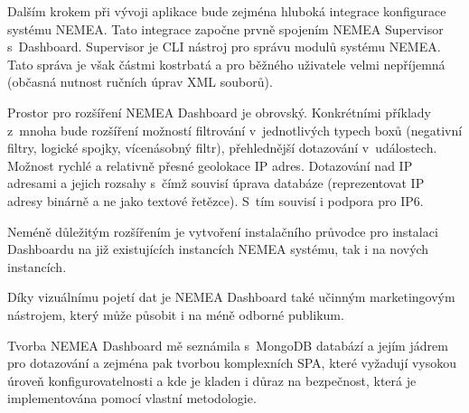 Dalším krokem při vývoji aplikace bude zejména hluboká integrace konfigurace systému NEMEA. Tato integrace započne prvně spojením NEMEA Supervisor s~Dashboard. Supervisor je CLI nástroj pro správu modulů systému NEMEA. Tato správa je však částmi kostrbatá a pro běžného uživatele velmi nepříjemná (občasná nutnost ručních úprav XML souborů).

Prostor pro rozšíření NEMEA Dashboard je obrovský. Konkrétními příklady z~mnoha bude rozšíření možností filtrování v~jednotlivých typech boxů (negativní filtry, logické spojky, vícenásobný filtr), přehlednější dotazování v~událostech. Možnost rychlé a relativně přesné geolokace IP adres. Dotazování nad IP adresami a jejich rozsahy s~čímž souvisí úprava databáze (reprezentovat IP adresy binárně a ne jako textové řetězce). S~tím souvisí i podpora pro IP6.

Neméně důležitým rozšířením je vytvoření instalačního průvodce pro instalaci Dashboardu na již existujících instancích NEMEA systému, tak i na nových instancích.

Díky vizuálnímu pojetí dat je NEMEA Dashboard také učinným marketingovým nástrojem, který může působit i na méně odborné publikum.

Tvorba NEMEA Dashboard mě seznámila s~MongoDB databází a jejím jádrem pro dotazování a zejména pak tvorbou komplexních SPA, které vyžadují vysokou úroveň konfigurovatelnosti a kde je kladen i důraz na bezpečnost, která je implementována pomocí vlastní metodologie.
